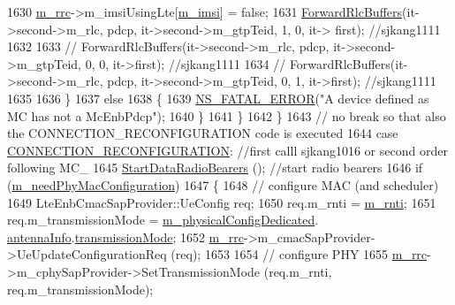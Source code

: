 \begin{DoxyCode}
1630               \hyperlink{classns3_1_1UeManager_ab4405e9f354c66e7c1a4c95832290f5b}{m\_rrc}->m\_imsiUsingLte[\hyperlink{classns3_1_1UeManager_a868dda076ecfc1d4202e357c16223d84}{m\_imsi}] = \textcolor{keyword}{false};
1631               \hyperlink{classns3_1_1UeManager_acfe070a93481248c1d2624f02a448a34}{ForwardRlcBuffers}(it->second->m\_rlc, pdcp, it->second->m\_gtpTeid, 1, 0, it->
      first); \textcolor{comment}{//sjkang1111}
1632 
1633             \textcolor{comment}{//  ForwardRlcBuffers(it->second->m\_rlc, pdcp, it->second->m\_gtpTeid, 0, 0, it->first);
       //sjkang1111}
1634             \textcolor{comment}{//  ForwardRlcBuffers(it->second->m\_rlc, pdcp, it->second->m\_gtpTeid, 0, 1, it->first);
       //sjkang1111}
1635 
1636             \}     
1637             \textcolor{keywordflow}{else}
1638             \{
1639               \hyperlink{group__fatal_ga5131d5e3f75d7d4cbfd706ac456fdc85}{NS\_FATAL\_ERROR}(\textcolor{stringliteral}{"A device defined as MC has not a McEnbPdcp"});
1640             \}
1641           \}
1642         \}
1643     \textcolor{comment}{// no break so that also the CONNECTION\_RECONFIGURATION code is executed}
1644     \textcolor{keywordflow}{case} \hyperlink{classns3_1_1UeManager_a2f4085fdd18d7125c27da44a5b8b6808abd13cee86acc2cb3c04241dec919c73f}{CONNECTION\_RECONFIGURATION}:  \textcolor{comment}{//first calll sjkang1016 or second order
       following MC\_}
1645       \hyperlink{classns3_1_1UeManager_ad03d22d27261b89b6b575e16b5855bd5}{StartDataRadioBearers} ();  \textcolor{comment}{//start radio bearers}
1646       \textcolor{keywordflow}{if} (\hyperlink{classns3_1_1UeManager_a2c655c5f3f0bdb4953405734118770df}{m\_needPhyMacConfiguration})
1647       \{
1648         \textcolor{comment}{// configure MAC (and scheduler)}
1649         LteEnbCmacSapProvider::UeConfig req;
1650         req.m\_rnti = \hyperlink{classns3_1_1UeManager_a5a72b4fe818f21993bd7f05d7e2c4f83}{m\_rnti};
1651         req.m\_transmissionMode = \hyperlink{classns3_1_1UeManager_a5fca85495adcd0de6823e738094aacaf}{m\_physicalConfigDedicated}.
      \hyperlink{structns3_1_1LteRrcSap_1_1PhysicalConfigDedicated_ae7fc9e40e971e9bdaf9f06e3a0ca9a56}{antennaInfo}.\hyperlink{structns3_1_1LteRrcSap_1_1AntennaInfoDedicated_af0565283e3839265f42c75c9f5b37c8c}{transmissionMode};
1652         \hyperlink{classns3_1_1UeManager_ab4405e9f354c66e7c1a4c95832290f5b}{m\_rrc}->m\_cmacSapProvider->UeUpdateConfigurationReq (req);
1653 
1654         \textcolor{comment}{// configure PHY}
1655         \hyperlink{classns3_1_1UeManager_ab4405e9f354c66e7c1a4c95832290f5b}{m\_rrc}->m\_cphySapProvider->SetTransmissionMode (req.m\_rnti, req.m\_transmissionMode);

\end{DoxyCode}
